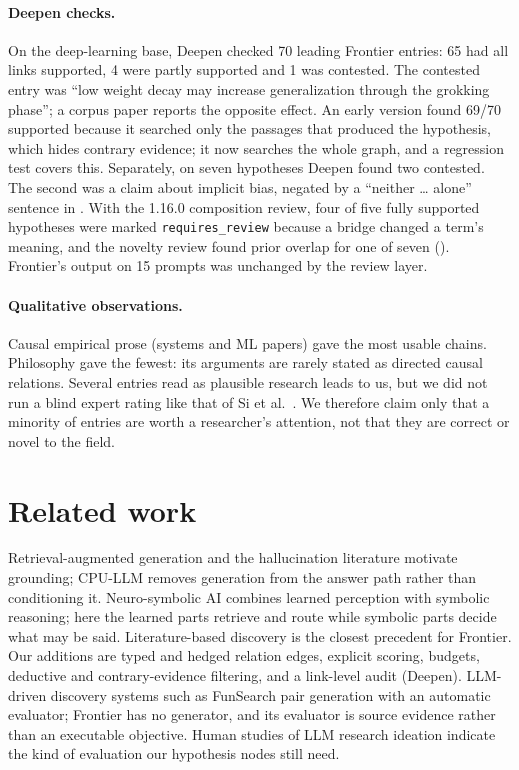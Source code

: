 \documentclass[11pt]{article}
\begin{document}
\paragraph{Deepen checks.} On the deep-learning base, Deepen checked 70 leading Frontier entries: 65 had all links
supported, 4 were partly supported and 1 was contested. The contested entry was ``low weight decay may increase
generalization through the grokking phase''; a corpus paper \cite{clauw2024grokking} reports the opposite effect.
An early version found 69/70 supported because it searched only the passages that produced the hypothesis, which
hides contrary evidence; it now searches the whole graph, and a regression test covers this. Separately, on seven
hypotheses Deepen found two contested. The second was a claim about implicit bias, negated by a ``neither \ldots{}
alone'' sentence in \cite{matveev2025biases}. With the 1.16.0 composition review, four of five fully supported
hypotheses were marked \texttt{requires\_review} because a bridge changed a term's meaning, and the novelty review
found prior overlap for one of seven (\cite{mayama2025iit}). Frontier's output on 15 prompts was unchanged by the
review layer.

\paragraph{Qualitative observations.} Causal empirical prose (systems and ML papers) gave the most usable chains.
Philosophy gave the fewest: its arguments are rarely stated as directed causal relations. Several entries read as
plausible research leads to us, but we did not run a blind expert rating like that of Si et al.\ \cite{si2024ideas}.
We therefore claim only that a minority of entries are worth a researcher's attention, not that they are correct
or novel to the field.

\section{Related work}

Retrieval-augmented generation \cite{lewis2020rag} and the hallucination literature \cite{ji2023hallucination}
motivate grounding; CPU-LLM removes generation from the answer path rather than conditioning it. Neuro-symbolic
AI \cite{garcez2020neurosymbolic} combines learned perception with symbolic reasoning; here the learned parts
retrieve and route while symbolic parts decide what may be said. Literature-based discovery
\cite{swanson1986fish,swanson1997arrowsmith,henry2017lbd} is the closest precedent for Frontier. Our additions
are typed and hedged relation edges, explicit scoring, budgets, deductive and contrary-evidence filtering, and a
link-level audit (Deepen). LLM-driven discovery systems such as FunSearch \cite{romeraparedes2024funsearch} pair
generation with an automatic evaluator; Frontier has no generator, and its evaluator is source evidence rather
than an executable objective. Human studies of LLM research ideation \cite{si2024ideas} indicate the kind of
evaluation our hypothesis nodes still need.
\end{document}
